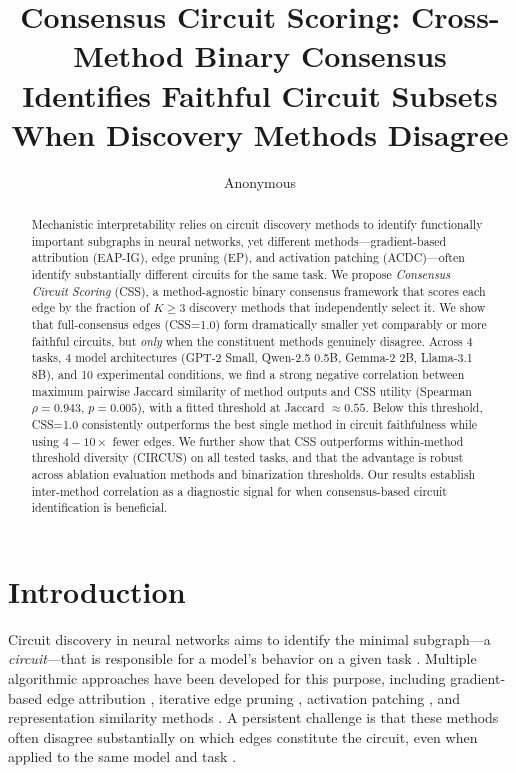 \documentclass[11pt]{article}
\title{Consensus Circuit Scoring: Cross-Method Binary Consensus\\Identifies Faithful Circuit Subsets When Discovery Methods Disagree}
\author{Anonymous}
\date{}
\newcommand{\css}{\textsc{CSS}}
\newcommand{\cssone}{\textsc{CSS}{=}1.0}
\begin{document}
\maketitle

\begin{abstract}
Mechanistic interpretability relies on circuit discovery methods to identify functionally important subgraphs in neural networks, yet different methods---gradient-based attribution (EAP-IG), edge pruning (EP), and activation patching (ACDC)---often identify substantially different circuits for the same task. We propose \emph{Consensus Circuit Scoring} (\css{}), a method-agnostic binary consensus framework that scores each edge by the fraction of $K\geq3$ discovery methods that independently select it. We show that full-consensus edges (\cssone{}) form dramatically smaller yet comparably or more faithful circuits, but \emph{only} when the constituent methods genuinely disagree. Across 4 tasks, 4 model architectures (GPT-2 Small, Qwen-2.5 0.5B, Gemma-2 2B, Llama-3.1 8B), and 10 experimental conditions, we find a strong negative correlation between maximum pairwise Jaccard similarity of method outputs and \css{} utility (Spearman $\rho = 0.943$, $p = 0.005$), with a fitted threshold at Jaccard $\approx 0.55$. Below this threshold, \cssone{} consistently outperforms the best single method in circuit faithfulness while using $4{-}10\times$ fewer edges. We further show that \css{} outperforms within-method threshold diversity (CIRCUS) on all tested tasks, and that the advantage is robust across ablation evaluation methods and binarization thresholds. Our results establish inter-method correlation as a diagnostic signal for when consensus-based circuit identification is beneficial.
\end{abstract}

\section{Introduction}
\label{sec:intro}

Circuit discovery in neural networks aims to identify the minimal subgraph---a \emph{circuit}---that is responsible for a model's behavior on a given task \citep{conmy2023automated,wang2023interpretability}. Multiple algorithmic approaches have been developed for this purpose, including gradient-based edge attribution \citep{syed2023attribution}, iterative edge pruning \citep{hanna2024have}, activation patching \citep{conmy2023automated}, and representation similarity methods \citep{marks2024sparse}. A persistent challenge is that these methods often disagree substantially on which edges constitute the circuit, even when applied to the same model and task \citep{mondorf2024beyond}.
\end{document}
